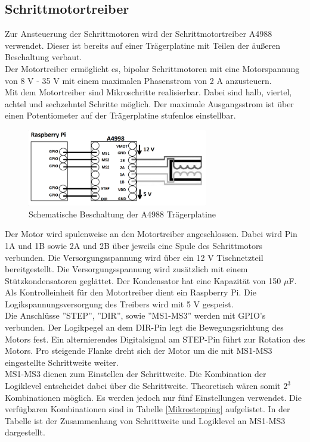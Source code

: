 \subsection{Schrittmotortreiber} \label{sec:Schrittmotortreiber}
Zur Ansteuerung der Schrittmotoren wird der Schrittmotortreiber A4988 verwendet. Dieser ist bereits auf einer Trägerplatine mit Teilen der äußeren Beschaltung verbaut.\\
Der Motortreiber ermöglicht es, bipolar Schrittmotoren mit eine Motorspannung von 8 V - 35 V mit einem maximalen Phasenstrom von 2 A anzusteuern. \cite{A4988}\\ 
Mit dem Motortreiber sind Mikroschritte realisierbar. Dabei sind halb, viertel, achtel und sechzehntel Schritte möglich. Der maximale Ausgangsstrom ist über einen Potentiometer auf der Trägerplatine stufenlos einstellbar. 

\begin{figure}[H] 
	\centering 
	\includegraphics[width=0.7\textwidth]{images/Hardware/A4988} 
	\caption{Schematische Beschaltung der A4988 Trägerplatine} 
	\label{A4988} 
\end{figure} 



Der Motor wird spulenweise an den Motortreiber angeschlossen. Dabei wird Pin 1A und 1B sowie 2A und 2B über jeweils eine Spule des Schrittmotors verbunden.
Die Versorgungsspannung wird über ein 12 V Tischnetzteil bereitgestellt. Die Versorgungsspannung wird zusätzlich mit einem Stützkondensatoren geglättet. Der Kondensator hat eine Kapazität von 150 $\mu$F.
Als Kontrolleinheit für den Motortreiber dient ein Raspberry Pi. Die Logikspannungsversorgung des Treibers wird mit 5 V gespeist.\\ 
Die Anschlüsse ''STEP'', ''DIR'', sowie ''MS1-MS3'' werden mit \ac{GPIO}’s verbunden. Der Logikpegel an dem DIR-Pin legt die Bewegungsrichtung des Motors fest. Ein alternierendes Digitalsignal am STEP-Pin führt zur Rotation des Motors. Pro steigende Flanke dreht sich der Motor um die mit MS1-MS3 eingestellte Schrittweite weiter. \\  
MS1-MS3 dienen zum Einstellen der Schrittweite. Die Kombination der Logiklevel entscheidet dabei über die Schrittweite. Theoretisch wären somit $2^{3}$ Kombinationen möglich. Es werden jedoch nur fünf Einstellungen verwendet. Die verfügbaren Kombinationen sind in Tabelle \ref{Mikrostepping} aufgelistet. In der Tabelle ist der Zusammenhang von Schrittweite und Logiklevel an MS1-MS3 dargestellt. 


